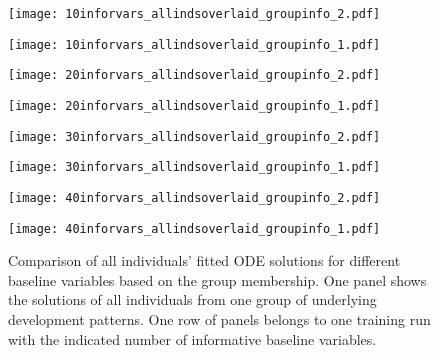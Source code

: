 \begin{figure}
	\centering
	\begin{minipage}{\linewidth}
		\begin{minipage}{.5\textwidth}
			\centering				
			\texttt{[image: 10inforvars\_allindsoverlaid\_groupinfo\_2.pdf]}
		\end{minipage}\begin{minipage}{.5\textwidth}
			\centering
			\vspace{4.2pt}
			\texttt{[image: 10inforvars\_allindsoverlaid\_groupinfo\_1.pdf]}
		\end{minipage}
	\end{minipage}
	\begin{minipage}{\linewidth}
		\begin{minipage}{.5\textwidth}
			\centering				
			\texttt{[image: 20inforvars\_allindsoverlaid\_groupinfo\_2.pdf]}
		\end{minipage}\begin{minipage}{.5\textwidth}
			\centering
			\vspace{4pt}			
			\texttt{[image: 20inforvars\_allindsoverlaid\_groupinfo\_1.pdf]}
		\end{minipage}
	\end{minipage}	
	\begin{minipage}{\linewidth}
		\begin{minipage}{.5\textwidth}
			\centering				
			\texttt{[image: 30inforvars\_allindsoverlaid\_groupinfo\_2.pdf]}
		\end{minipage}\begin{minipage}{.5\textwidth}
			\centering
			\hspace*{1pt}
			\texttt{[image: 30inforvars\_allindsoverlaid\_groupinfo\_1.pdf]}
		\end{minipage}
	\end{minipage}
	\begin{minipage}{\linewidth}
		\begin{minipage}{.5\textwidth}
			\centering				
			\texttt{[image: 40inforvars\_allindsoverlaid\_groupinfo\_2.pdf]}
		\end{minipage}\begin{minipage}{.5\textwidth}
			\centering
			\vspace{4.5pt}
			\texttt{[image: 40inforvars\_allindsoverlaid\_groupinfo\_1.pdf]}
		\end{minipage}
	\end{minipage}
	\caption{Comparison of all individuals' fitted ODE solutions for different baseline variables based on the group membership. One panel shows the solutions of all individuals from one group of underlying development patterns. One row of panels belongs to one training run with the indicated number of informative baseline variables.}
	\label{fig:apps_allindsoverlaid_diffnobaselines_groupinfo}
\end{figure}

